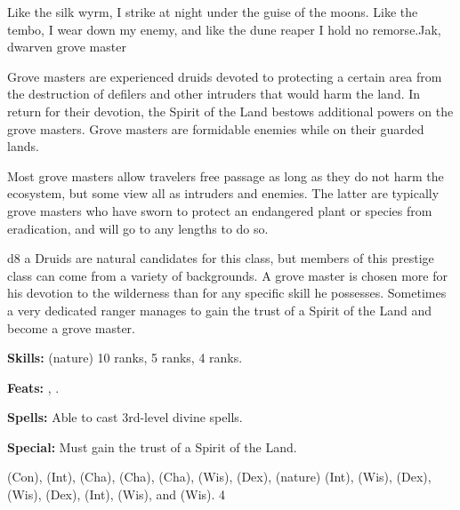{Like the silk wyrm, I strike at night under the guise of the moons. Like the tembo, I wear down my enemy, and like the dune reaper I hold no remorse.}{Jak, dwarven grove master}
{Grove masters are experienced druids devoted to protecting a certain area from the destruction of defilers and other intruders that would harm the land. In return for their devotion, the Spirit of the Land bestows additional powers on the grove masters. Grove masters are formidable enemies while on their guarded lands.

Most grove masters allow travelers free passage as long as they do not harm the ecosystem, but some view all as intruders and enemies. The latter are typically grove masters who have sworn to protect an endangered plant or species from eradication, and will go to any lengths to do so.}
{d8}
{a}
{Druids are natural candidates for this class, but members of this prestige class can come from a variety of backgrounds. A grove master is chosen more for his devotion to the wilderness than for any specific skill he possesses. Sometimes a very dedicated ranger manages to gain the trust of a Spirit of the Land and become a grove master.}
{
\textbf{Skills:}  (nature) 10 ranks,  5 ranks,  4 ranks.

\textbf{Feats:} , .

\textbf{Spells:} Able to cast 3rd-level divine spells.

\textbf{Special:} Must gain the trust of a Spirit of the Land.
}
{ (Con),  (Int),  (Cha),  (Cha),  (Cha),  (Wis),  (Dex),  (nature) (Int),  (Wis),  (Dex),  (Wis),  (Dex),  (Int),  (Wis), and  (Wis).
}
{4}

